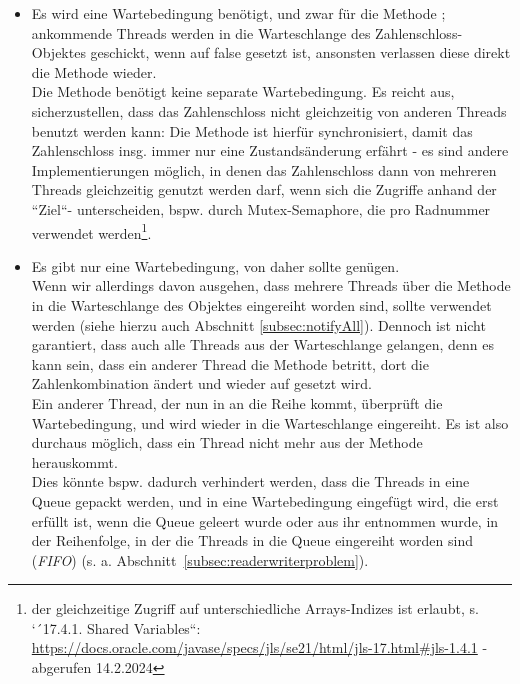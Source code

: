 \begin{itemize}
    \item Es wird eine Wartebedingung benötigt, und zwar für die Methode ; ankommende Threads werden
    in die Warteschlange des Zahlenschloss-Objektes geschickt, wenn  auf false gesetzt ist, ansonsten
    verlassen diese direkt die Methode wieder.\\
    Die Methode  benötigt keine separate Wartebedingung.
    Es reicht aus, sicherzustellen, dass das Zahlenschloss nicht gleichzeitig von anderen Threads benutzt werden kann:
    Die Methode  ist hierfür synchronisiert, damit das Zahlenschloss {insg.} immer nur eine Zustandsänderung
    erfährt - es sind andere Implementierungen möglich, in denen das Zahlenschloss dann von mehreren Threads gleichzeitig
    genutzt werden darf, wenn sich die Zugriffe anhand der ``Ziel``- unterscheiden, {bspw.} durch Mutex-Semaphore,
    die pro Radnummer verwendet werden\footnote{
        der gleichzeitige Zugriff auf unterschiedliche Arrays-Indizes ist erlaubt, s. `´17.4.1. Shared Variables``: \url{https://docs.oracle.com/javase/specs/jls/se21/html/jls-17.html#jls-1.4.1} - abgerufen 14.2.2024
    }.
    \item Es gibt nur eine Wartebedingung, von daher sollte  genügen.\\
    Wenn wir allerdings davon ausgehen, dass mehrere Threads über die Methode  in die Warteschlange des Objektes eingereiht worden sind,  sollte  verwendet werden (siehe hierzu auch Abschnitt \ref{subsec:notifyAll}).
    Dennoch ist nicht garantiert, dass auch alle Threads aus der Warteschlange gelangen, denn es kann sein, dass ein anderer Thread die Methode  betritt, dort die
    Zahlenkombination ändert und  wieder auf  gesetzt wird. \\
    Ein anderer Thread, der nun in   an die Reihe kommt, überprüft die Wartebedingung, und wird wieder in die Warteschlange eingereiht.
    Es ist also durchaus möglich, dass ein Thread nicht mehr aus der Methode  herauskommt.\\
    Dies könnte bspw. dadurch verhindert werden, dass die Threads in eine Queue gepackt werden, und in  eine Wartebedingung eingefügt wird, die erst erfüllt ist,
    wenn die Queue geleert wurde oder aus ihr entnommen wurde, in der Reihenfolge, in der die Threads in die Queue eingereiht worden sind (\textit{FIFO}) (s. a. Abschnitt~\ref{subsec:readerwriterproblem}).

\end{itemize}
